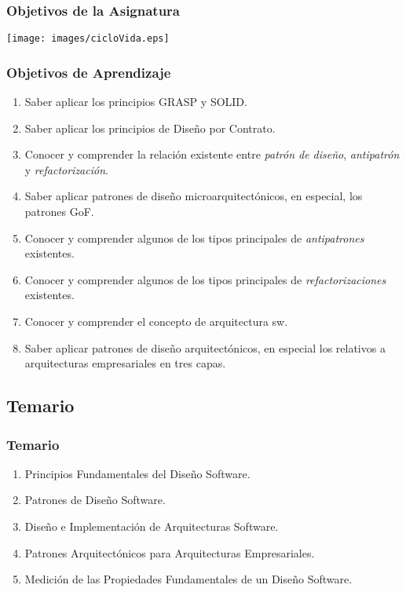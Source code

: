 \documentclass[animated,a4paper,slidestop,xcolor=pst,blue]{beamer}
\begin{document}
\begin{frame}[c]
	\frametitle{Objetivos de la Asignatura}
    \begin{center}
        \texttt{[image: images/cicloVida.eps]}
    \end{center}
\end{frame}

\begin{frame}[c]
	\frametitle{Objetivos de Aprendizaje}
    \begin{enumerate}[<+->]
            \item Saber aplicar los principios \alert{GRASP} y \alert{SOLID}.
            \item Saber aplicar los principios de \alert{Diseño por Contrato}.
            \item Conocer y comprender la relación existente entre \alert{\emph{patrón de diseño}}, \alert{\emph{antipatrón}} y \alert{\emph{refactorización}}.
            \item Saber aplicar patrones de diseño microarquitectónicos, en especial, los \alert{patrones GoF}.
            \item Conocer y comprender algunos de los tipos principales de \alert{\emph{antipatrones}} existentes.
            \item Conocer y comprender algunos de los tipos principales de \alert{\emph{refactorizaciones}} existentes.
            \item Conocer y comprender el concepto de arquitectura sw.
            \item Saber aplicar patrones de diseño arquitectónicos, en especial los relativos a \alert{arquitecturas empresariales en tres capas}.
    \end{enumerate}
\end{frame}

\subsection{Temario}

\begin{frame}[c]
	\frametitle{Temario}
	\begin{enumerate}
		\item<1-> Principios Fundamentales del Diseño Software.
		\item<2-> Patrones de Diseño Software.
		\item<3-> Diseño e Implementación de Arquitecturas Software.
		\item<4-> Patrones Arquitectónicos para Arquitecturas Empresariales.
        \item<5-> Medición de las Propiedades Fundamentales de un Diseño Software.
	\end{enumerate}
\end{frame}
\end{document}
